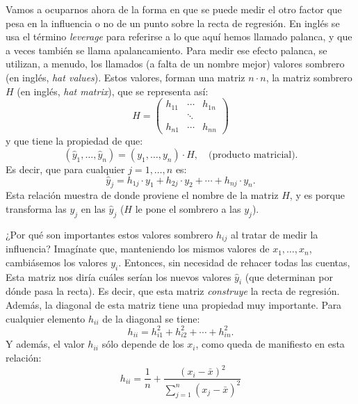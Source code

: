 Vamos a  ocuparnos ahora de la forma en que se puede medir el otro factor que pesa en la influencia o no de un punto sobre la recta de regresión. En inglés se usa el término {\em leverage} para referirse a lo que aquí hemos llamado {\sf palanca}, y que a veces también se llama {\sf apalancamiento}. Para medir ese efecto palanca, se utilizan, a menudo, los llamados (a falta de un nombre mejor) {\sf valores sombrero} (en inglés, {\em hat values}). Estos valores, forman una matriz $n\cdot n$, la {\sf matriz sombrero} $H$ (en inglés, {\em hat matrix}), que se representa así:
    \[H=\left(
        \begin{array}{ccc}
        h_{11}&\cdots&h_{1n}\\
        &\ddots&\\
        h_{n1}&\cdots&h_{nn}
        \end{array}
        \right)
    \]
y que tiene la propiedad de que:
\[(\hat y_1,\ldots,\hat y_n) = (y_1,\ldots,y_n)\cdot H,\quad \mbox{(producto matricial).}\]
Es decir, que para cualquier $j=1,\ldots,n$ es:
\begin{equation}\label{cap10:ecu:valoresPalanca}
    \hat y_j = h_{1j}\cdot y_1+h_{2j}\cdot y_2+\cdots+h_{nj}\cdot y_n.
\end{equation}
Esta relación muestra de donde proviene el nombre de la matriz $H$, y es porque transforma las $y_j$ en las $\hat y_j$ ($H$ le pone el sombrero a las $y_j$).

¿Por qué son importantes estos valores sombrero $h_{ij}$ al tratar de medir la influencia? Imagínate que, manteniendo los mismos valores de $x_1,\ldots, x_n$, cambiásemos los valores $y_i$. Entonces, sin necesidad de rehacer todas las cuentas, Esta matriz nos diría cuáles serían los nuevos valores $\hat y_i$ (que determinan por dónde pasa la recta). Es decir, que esta matriz {\em construye} la recta de regresión. Además, la diagonal de esta matriz tiene una propiedad muy importante. Para cualquier elemento $h_{ii}$ de la diagonal se tiene:
\begin{equation}\label{cap10:ecu:valoresPalanca2}
    h_{ii}= h_{i1}^2+h_{i2}^2+\cdots+h_{in}^2.
\end{equation}
Y además, el valor $h_{ii}$ sólo depende de los $x_i$, como queda de manifiesto en esta relación:
\[
h_{ii}=\dfrac{1}{n}+\dfrac{(x_i-\bar x)^2}{\displaystyle\sum_{j=1}^n(x_j-\bar x)^2}
\]

